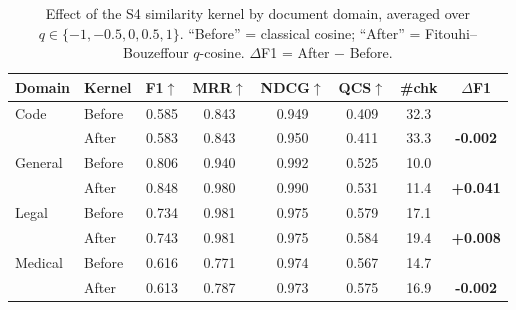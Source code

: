 \begin{table}[t]\centering
\caption{Effect of the S4 similarity kernel by document domain, averaged over $q\in\{-1,-0.5,0,0.5,1\}$. ``Before'' = classical cosine; ``After'' = Fitouhi--Bouzeffour $q$-cosine. $\Delta$F1 = After $-$ Before.}
\label{tab:qcos_by_domain}
\begin{tabular}{@{}l l ccccc c@{}}\toprule
Domain & Kernel & F1$\uparrow$ & MRR$\uparrow$ & NDCG$\uparrow$ & QCS$\uparrow$ & \#chk & $\Delta$F1 \\\midrule
Code & Before & 0.585 & 0.843 & 0.949 & 0.409 & 32.3 &  \\
 & After & 0.583 & 0.843 & 0.950 & 0.411 & 33.3 & \textbf{-0.002} \\
\addlinespace[1pt]
General & Before & 0.806 & 0.940 & 0.992 & 0.525 & 10.0 &  \\
 & After & 0.848 & 0.980 & 0.990 & 0.531 & 11.4 & \textbf{+0.041} \\
\addlinespace[1pt]
Legal & Before & 0.734 & 0.981 & 0.975 & 0.579 & 17.1 &  \\
 & After & 0.743 & 0.981 & 0.975 & 0.584 & 19.4 & \textbf{+0.008} \\
\addlinespace[1pt]
Medical & Before & 0.616 & 0.771 & 0.974 & 0.567 & 14.7 &  \\
 & After & 0.613 & 0.787 & 0.973 & 0.575 & 16.9 & \textbf{-0.002} \\
\bottomrule\end{tabular}\end{table}
